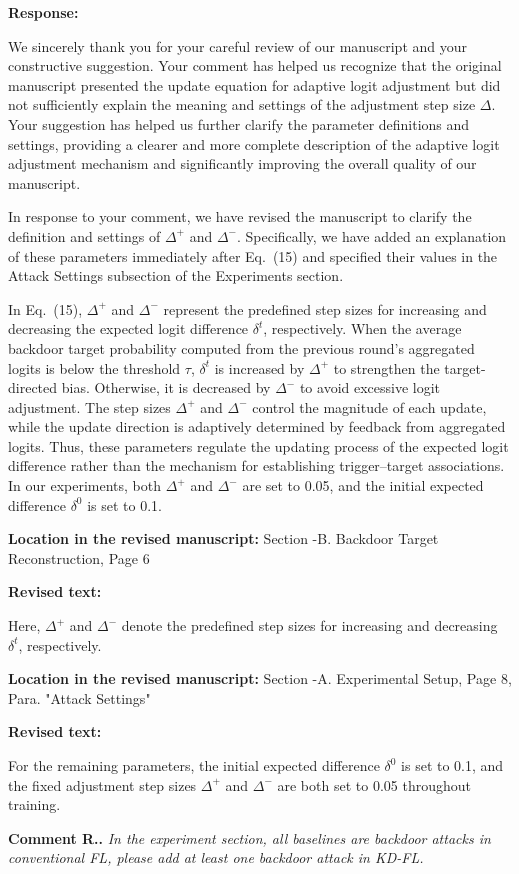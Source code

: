 \documentclass[11pt,a4paper]{article}
\newcommand{\manualindent}{\par\noindent\hspace*{1.5em}\ignorespaces}
\newcounter{reviewernum}
\newcounter{commentnum}
\newcommand{\reviewcomment}[1]{%
  \stepcounter{commentnum}%
  \begin{tcolorbox}[
      enhanced,breakable,colback=black!3,colframe=black!20,
      boxrule=0.5pt,arc=1.2mm,left=9pt,right=9pt,top=8pt,bottom=8pt]
    {\bfseries Comment R\arabic{reviewernum}.\arabic{commentnum}.}\quad
    {\itshape #1}
  \end{tcolorbox}%
}
\newcommand{\authorresponse}[1]{%
  {\bfseries\color{replyblue}Response:}\par
  #1\par\vspace{0.35em}%
}
\newcommand{\revisedtext}[2]{%
  {\bfseries\color{headingnavy}Location in the revised manuscript:} #1\par
  \begin{tcolorbox}[
      enhanced,breakable,colback=replyblue!3,colframe=replyblue!18,
      before upper={\setlength{\parskip}{6pt}},
      borderline west={2.5pt}{0pt}{replyblue},
      boxrule=0.5pt,arc=1mm,left=11pt,right=9pt,top=8pt,bottom=8pt]
    {\bfseries\color{headingnavy}Revised text:}\par
    #2
  \end{tcolorbox}
  \vspace{0.35em}%
}
\begin{document}
\authorresponse{\manualindent We sincerely thank you for your careful review of our manuscript and your constructive suggestion.
Your comment has helped us recognize that the original manuscript presented the update equation for adaptive logit adjustment but did not sufficiently explain the meaning and settings of the adjustment step size $\Delta$.
Your suggestion has helped us further clarify the parameter definitions and settings, providing a clearer and more complete description of the adaptive logit adjustment mechanism and significantly improving the overall quality of our manuscript.

\manualindent In response to your comment, we have revised the manuscript to clarify the definition and settings of \(\Delta^+\) and \(\Delta^-\). 
Specifically, we have added an explanation of these parameters immediately after Eq.~(15) and specified their values in the Attack Settings subsection of the Experiments section.

\manualindent In Eq.~(15), $\Delta^+$ and $\Delta^-$ represent the predefined step sizes for increasing and decreasing the expected logit difference $\delta^t$, respectively.
When the average backdoor target probability computed from the previous round's aggregated logits is below the threshold $\tau$, $\delta^t$ is increased by $\Delta^+$ to strengthen the target-directed bias.
Otherwise, it is decreased by $\Delta^-$ to avoid excessive logit adjustment.
The step sizes $\Delta^+$ and $\Delta^-$ control the magnitude of each update, while the update direction is adaptively determined by feedback from aggregated logits.
Thus, these parameters regulate the updating process of the expected logit difference rather than the mechanism for establishing trigger--target associations.
In our experiments, both $\Delta^+$ and $\Delta^-$ are set to 0.05, and the initial expected difference $\delta^0$ is set to 0.1.}

\revisedtext{Section \uppercase\expandafter{}-B. Backdoor Target Reconstruction, Page 6}
{Here, $\Delta^+$ and $\Delta^-$ denote the predefined step sizes for increasing and decreasing $\delta^t$, respectively.}

\revisedtext{Section \uppercase\expandafter{}-A. Experimental Setup, Page 8, Para. "Attack Settings"}
{For the remaining parameters, the initial expected difference $\delta^0$ is set to 0.1, and the fixed adjustment step sizes $\Delta^+$ and $\Delta^-$ are both set to 0.05 throughout training.}

\reviewcomment{In the experiment section, all baselines are backdoor attacks in conventional FL, please add at least one backdoor attack in KD-FL.}
\end{document}
